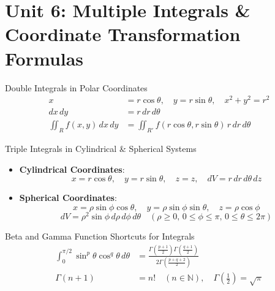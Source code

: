 \chapter{Unit 6: Multiple Integrals \& Coordinate Transformation Formulas}

\begin{formulabox}{Double Integrals in Polar Coordinates}
\begin{align*}
x &= r\cos\theta, \quad y = r\sin\theta, \quad x^2 + y^2 = r^2 \\
dx \, dy &= r \, dr \, d\theta \\
\iint_R f(x,y) \, dx \, dy &= \iint_{R'} f(r\cos\theta, r\sin\theta) \, r \, dr \, d\theta
\end{align*}
\end{formulabox}

\begin{formulabox}{Triple Integrals in Cylindrical \& Spherical Systems}
\begin{itemize}
    \item \textbf{Cylindrical Coordinates}:
    \begin{equation*}
    x = r\cos\theta, \quad y = r\sin\theta, \quad z = z, \quad dV = r \, dr \, d\theta \, dz
    \end{equation*}
    \item \textbf{Spherical Coordinates}:
    \begin{equation*}
    x = \rho\sin\phi\cos\theta, \quad y = \rho\sin\phi\sin\theta, \quad z = \rho\cos\phi
    \end{equation*}
    \begin{equation*}
    dV = \rho^2 \sin\phi \, d\rho \, d\phi \, d\theta \quad (\rho \ge 0, \, 0 \le \phi \le \pi, \, 0 \le \theta \le 2\pi)
    \end{equation*}
\end{itemize}
\end{formulabox}

\begin{formulabox}{Beta and Gamma Function Shortcuts for Integrals}
\begin{align*}
\int_0^{\pi/2} \sin^p\theta \cos^q\theta \, d\theta &= \frac{\Gamma\left(\frac{p+1}{2}\right)\Gamma\left(\frac{q+1}{2}\right)}{2\Gamma\left(\frac{p+q+2}{2}\right)} \\
\Gamma(n+1) &= n! \quad (n \in \mathbb{N}), \quad \Gamma\left(\frac{1}{2}\right) = \sqrt{\pi}
\end{align*}
\end{formulabox}
